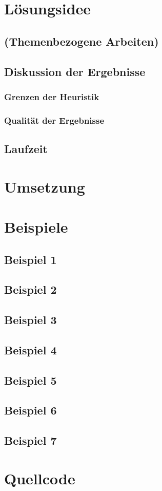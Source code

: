 \documentclass[a4paper,10pt,ngerman]{scrartcl}
\begin{document}
\section{Lösungsidee}



\subsection{(Themenbezogene Arbeiten)}







\subsection{Diskussion der Ergebnisse}
\subsubsection{Grenzen der Heuristik}
\subsubsection{Qualität der Ergebnisse}

\subsection{Laufzeit}

\section{Umsetzung}\label{sec:umsetzung}

\section{Beispiele}
\subsection{Beispiel 1}\label{ex:1}
\subsection{Beispiel 2}\label{ex:2}
\subsection{Beispiel 3}\label{ex:3}
\subsection{Beispiel 4}\label{ex:4}
\subsection{Beispiel 5}\label{ex:5}
\subsection{Beispiel 6}\label{ex:6}
\subsection{Beispiel 7}\label{ex:7}


\section{Quellcode}

\end{document}
